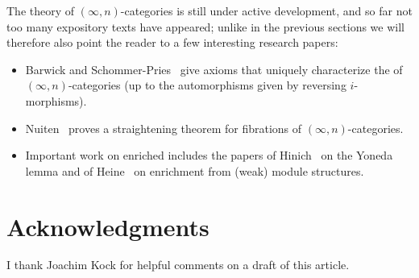 \documentclass[a4paper,12pt]{article}
\begin{document}
The theory of $(\infty,n)$-categories is still under active
development, and so far not too many expository texts have appeared;
unlike in the previous sections we will therefore also point the
reader to a few interesting research papers:
\begin{itemize}
\item Barwick and Schommer-Pries~\cite{BSP} give axioms that uniquely
  characterize the \icat{} of $(\infty,n)$-categories (up to the
  automorphisms given by reversing $i$-morphisms).
\item Nuiten~\cite{Nuiten} proves a straightening theorem for
  fibrations of $(\infty,n)$-categories.
\item Important work on enriched \icats{} includes the papers of
  Hinich~\cite{HinichYoneda} on the Yoneda lemma and of
  Heine~\cite{Heine} on enrichment from (weak) module structures.
\end{itemize}

\section*{Acknowledgments}
I thank Joachim Kock for helpful comments on a draft of this article.
\end{document}
